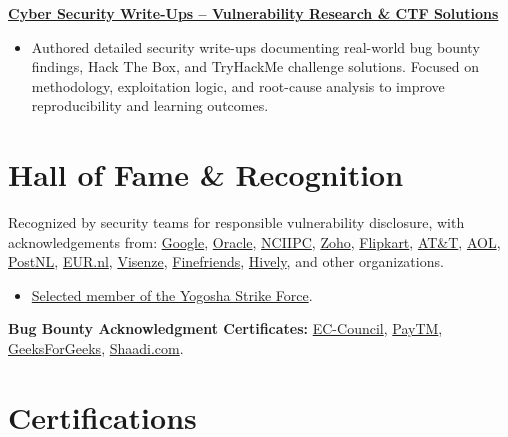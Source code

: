 \documentclass[10pt,a4paper]{article}
\newcommand{\project}[2]{
    \textbf{#1} \hfill \textit{#2}\\[-2pt]
}
\begin{document}
\project{\href{https://zishanhack.com/blog}{Cyber Security Write-Ups -- Vulnerability Research \& CTF Solutions}}{}
\begin{itemize}
    \item Authored detailed security write-ups documenting real-world bug bounty findings, Hack The Box, and TryHackMe challenge solutions. Focused on methodology, exploitation logic, and root-cause analysis to improve reproducibility and learning outcomes.
\end{itemize}

\section{Hall of Fame \& Recognition}

Recognized by security teams for responsible vulnerability disclosure, with acknowledgements from:
\href{https://bughunters.google.com/leaderboard/honorable-mentions}{Google},
\href{https://www.oracle.com/security-alerts/cpuapr2018.html}{Oracle},
\href{https://nciipc.gov.in/documents/NCIIPC_Newsletter_Oct19.pdf}{NCIIPC},
\href{https://bugbounty.zohocorp.com/bb/info#hof}{Zoho},
\href{https://hackerone.com/flipkart}{Flipkart},
\href{https://hackerone.com/att}{AT\&T},
\href{https://web.archive.org/web/20191231125749/https://contact.security.aol.com/hof/}{AOL},
\href{https://www.postnl.nl/en/responsible-disclosure/}{PostNL},
\href{https://www.eur.nl/en/campus/locations/campus-woudestein/security-safety/information-security/hall-fame}{EUR.nl},
\href{https://www.visenze.com/hall-of-fame/}{Visenze},
\href{https://finefriends.social/security/hof}{Finefriends},
\href{https://support.teamhively.com/general-use/i-found-a-bug-what-should-i-do/}{Hively},
and other organizations.

\begin{itemize}
    \item \href{https://app.yogosha.com/r/ZishanAdThandar}{Selected member of the Yogosha Strike Force}.
\end{itemize}

\textbf{Bug Bounty Acknowledgment Certificates:}
\href{https://zishanhack.com/about/img/certificate/eccouncil1.jpg}{EC-Council},
\href{https://zishanhack.com/about/img/certificate/paytm.jpg}{PayTM},
\href{https://web.archive.org/web/20220521173955/https://www.geeksforgeeks.org/certificates/?hof=1}{GeeksForGeeks},
\href{https://zishanhack.com/about/img/certificate/shaadi.jpg}{Shaadi.com}.

\section{Certifications}
\end{document}
